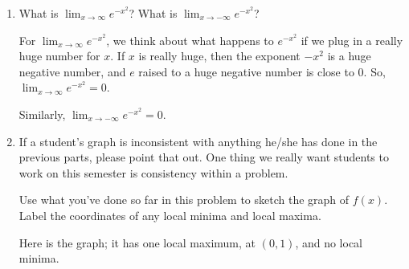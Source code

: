 \documentclass{article}
\begin{document}
\begin{enumerate}
\begin{enumerate}
  \item
    \begin{problem}[\vfill]
      What is $\displaystyle \lim_{x \to \infty} e^{-x^2}$?  What is
      $\displaystyle \lim_{x \to -\infty} e^{-x^2}$?
    \end{problem}

    \begin{solution}
      For $\displaystyle \lim_{x \to \infty} e^{-x^2}$, we think about
      what happens to $e^{-x^2}$ if we plug in a really huge number for
      $x$.  If $x$ is really huge, then the exponent $-x^2$ is a huge
      negative number, and $e$ raised to a huge negative number is close
      to 0.  So, $\displaystyle \lim_{x \to \infty} e^{-x^2} = 0$.

      Similarly, $\displaystyle \lim_{x \to -\infty} e^{-x^2} = 0$. 
    \end{solution}

  \item

    \begin{grading}
      If a student's graph is inconsistent with anything he/she has done
      in the previous parts, please point that out.  One thing we really
      want students to work on this semester is consistency within a
      problem. 
    \end{grading}

    \begin{problem}[\nstretch{2}]
      Use what you've done so far in this problem to sketch the graph of
      $f(x)$.  Label the coordinates of any local minima and local
      maxima.

    \end{problem}

    \begin{solution}
      Here is the graph; it has one local maximum, at $(0, 1)$, and no
      local minima.
      \begin{center}
      \end{center}
    \end{solution}


\end{enumerate}
\end{enumerate}
\end{document}
